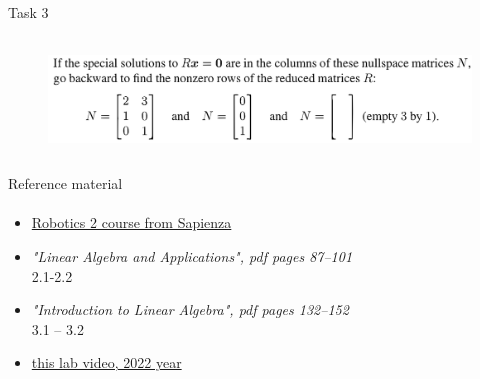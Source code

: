 \documentclass[aspectratio=169]{beamer}
\begin{document}
\begin{frame}[t]{Task 3}
    \framesubtitle{}
    \begin{figure}[H]
        \centering\includegraphics[height=3cm,width=1\textwidth,keepaspectratio]{3.png}
        \label{fig:3.png}
    \end{figure}
\end{frame}

\begin{frame}[t]{Reference material}
    \framesubtitle{}
    \Large
    \begin{itemize}
        \item \href{http://diag.uniroma1.it/~deluca/rob2_en.php}{Robotics 2 course from Sapienza}
        \item \textit{"Linear Algebra and Applications", pdf pages 87--101 } \\ 2.1-2.2
        \item \textit{"Introduction to Linear Algebra", pdf pages 132--152 }\\  3.1 -- 3.2
        \item \href{https://youtu.be/95KM1JWs_Bg}{this lab video, 2022 year}
    \end{itemize}
\end{frame}
\end{document}
